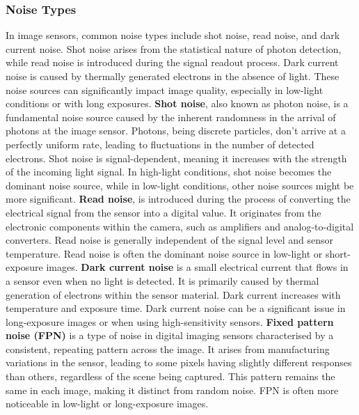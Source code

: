 \documentclass[10pt]{article}
\begin{document}
\begin{multicols}{2}
\subsubsection{Noise Types}
In image sensors, common noise types include shot noise, read noise, and dark current noise. Shot noise arises from the statistical nature of photon detection, while read noise is introduced during the signal readout process. Dark current noise is caused by thermally generated electrons in the absence of light. These noise sources can significantly impact image quality, especially in low-light conditions or with long exposures. 
\newline \newline
\textbf{Shot noise}, also known as photon noise, is a fundamental noise source caused by the inherent randomness in the arrival of photons at the image sensor.
Photons, being discrete particles, don't arrive at a perfectly uniform rate, leading to fluctuations in the number of detected electrons.  Shot noise is signal-dependent, meaning it increases with the strength of the incoming light signal. 
In high-light conditions, shot noise becomes the dominant noise source, while in low-light conditions, other noise sources might be more significant. 
\newline \newline
\textbf{Read noise}, is introduced during the process of converting the electrical signal from the sensor into a digital value. It originates from the electronic components within the camera, such as amplifiers and analog-to-digital converters.
Read noise is generally independent of the signal level and sensor temperature. Read noise is often the dominant noise source in low-light or short-exposure images.
\newline \newline
\textbf{Dark current noise}  is a small electrical current that flows in a sensor even when no light is detected. It is primarily caused by thermal generation of electrons within the sensor material.
Dark current increases with temperature and exposure time. Dark current noise can be a significant issue in long-exposure images or when using high-sensitivity sensors. 
\newline \newline
\textbf{Fixed pattern noise (FPN)} is a type of noise in digital imaging sensors characterised by a consistent, repeating pattern across the image. It arises from manufacturing variations in the sensor, leading to some pixels having slightly different responses than others, regardless of the scene being captured. This pattern remains the same in each image, making it distinct from random noise. FPN is often more noticeable in low-light or long-exposure images. 

\end{multicols}
\end{document}
